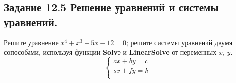 \subsection*{\textbf{Задание 12.5} Решение уравнений и системы уравнений.}
Решите уравнение $x^4 + x^3 - 5x - 12 = 0$;
решите системы уравнений двумя сопособами, используя функции \textbf{Solve} и \textbf{LinearSolve} от переменных $x$, $y$.
\[
    \begin{cases}
        ax + by = c \\
        sx + fy = h \\
    \end{cases}
\]

\begin{figure}[H]
    \renewcommand{\figurename}{Рисунок}
    \label{fig:image_12_5}
\end{figure}